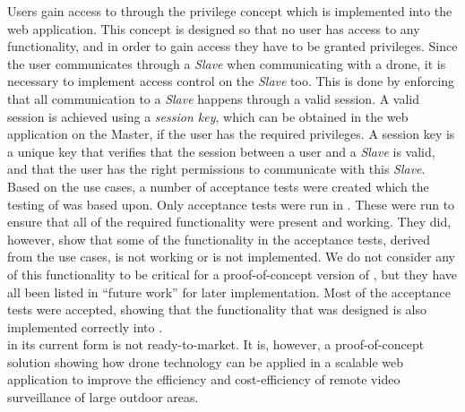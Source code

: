 Users gain access to \projectname{} through the privilege concept which is implemented into the web application. 
This concept is designed so that no user has access to any functionality, and in order to gain access they have to be granted privileges. 
Since the user communicates through a \emph{Slave} when communicating with a drone, it is necessary to implement access control on the \emph{Slave} too. 
This is done by enforcing that all communication to a \emph{Slave} happens through a valid session. 
A valid session is achieved using a \emph{session key}, which can be obtained in the web application on the Master, if the user has the required privileges. 
A session key is a unique key that verifies that the session between a user and a \emph{Slave} is valid, and that the user has the right permissions to communicate with this \emph{Slave}. \\

Based on the use cases, a number of acceptance tests were created which the testing of \projectname{} was based upon. 
Only acceptance tests were run in \projectname{}. 
These were run to ensure that all of the required functionality were present and working. 
They did, however, show that some of the functionality in the acceptance tests, derived from the use cases, is not working or is not implemented. 
We do not consider any of this functionality to be critical for a proof-of-concept version of \projectname{}, but they have all been listed in ``future work'' for later implementation. 
Most of the acceptance tests were accepted, showing that the functionality that was designed is also implemented correctly into \projectname{}. \\

\projectname{} in its current form is not ready-to-market.
It is, however, a proof-of-concept solution showing how drone technology can be applied in a scalable web application to improve the efficiency and cost-efficiency of remote video surveillance of large outdoor areas.